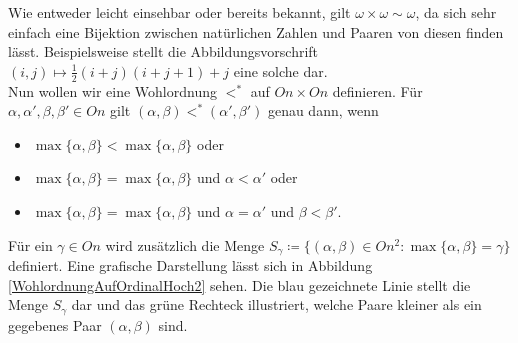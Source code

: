 \documentclass[german]{article}
\theoremstyle{break}
\theoremstyle{def_style}
\theoremstyle{def_style}
\theoremstyle{lemma_style}
\begin{document}
Wie entweder leicht einsehbar oder bereits bekannt, gilt $\omega\times\omega\sim\omega$, da sich sehr einfach eine Bijektion zwischen natürlichen Zahlen und Paaren von diesen finden lässt. Beispielsweise stellt die Abbildungsvorschrift $(i,j)\mapsto\frac{1}{2}(i+j)(i+j+1)+j$ eine solche dar.
\\

Nun wollen wir eine Wohlordnung $<^\ast$ auf $On\times On$ definieren. Für $\alpha,\alpha',\beta,\beta'\in On$ gilt $(\alpha,\beta)<^\ast(\alpha',\beta')$ genau dann, wenn
\begin{itemize}
	\item $\max\{\alpha,\beta\}<\max\{\alpha,\beta\}$ oder
	\item $\max\{\alpha,\beta\}=\max\{\alpha,\beta\}$ und $\alpha<\alpha'$ oder
	\item $\max\{\alpha,\beta\}=\max\{\alpha,\beta\}$ und $\alpha=\alpha'$ und $\beta<\beta'$.
\end{itemize}

Für ein $\gamma\in On$ wird zusätzlich die Menge $S_\gamma\coloneqq\{(\alpha,\beta)\in On^2:\max\{\alpha,\beta\}=\gamma\}$ definiert. Eine grafische Darstellung lässt sich in Abbildung \ref{WohlordnungAufOrdinalHoch2} sehen. Die blau gezeichnete Linie stellt die Menge $S_\gamma$ dar und das grüne Rechteck illustriert, welche Paare kleiner als ein gegebenes Paar $(\alpha,\beta)$ sind.
\end{document}

